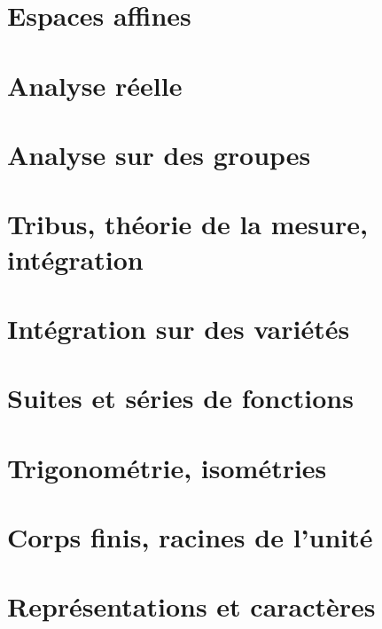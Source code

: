 \documentclass[a4paper,twoside,11pt]{book}
\begin{document}
\chapter{Espaces affines}


\chapter{Analyse réelle}








\chapter{Analyse sur des groupes}


\chapter{Tribus, théorie de la mesure, intégration}






\chapter{Intégration sur des variétés}






\chapter{Suites et séries de fonctions}




\chapter{Trigonométrie, isométries}





\chapter{Corps finis, racines de l'unité}



\chapter{Représentations et caractères}

\end{document}
